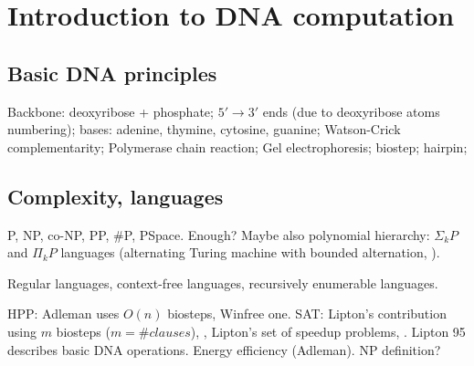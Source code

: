 \chapter{Introduction to DNA computation}

\section{Basic DNA principles}
	
	Backbone: deoxyribose + phosphate; $5'\rightarrow 3'$ ends (due to deoxyribose atoms numbering); bases: adenine, thymine, cytosine, guanine; Watson-Crick complementarity; Polymerase chain reaction; Gel electrophoresis; biostep; hairpin; 

\section{Complexity, languages}
	
	P, NP, co-NP, PP, \#P, PSpace. Enough? Maybe also polynomial hierarchy: $\Sigma_k P$ and $\Pi_k P$ languages (alternating Turing machine with bounded alternation, \cite{kozen06}).
	
	
	Regular languages, context-free languages, recursively enumerable languages.
	
	
	HPP: Adleman uses $O(n)$ biosteps, Winfree one.
	SAT: Lipton's contribution using $m$ biosteps ($m = \#clauses$), \cite{lipton95}, Lipton's set of speedup problems, \cite{lipton96speedup}.
	Lipton 95 describes basic DNA operations.
	Energy efficiency (Adleman).
	NP definition?